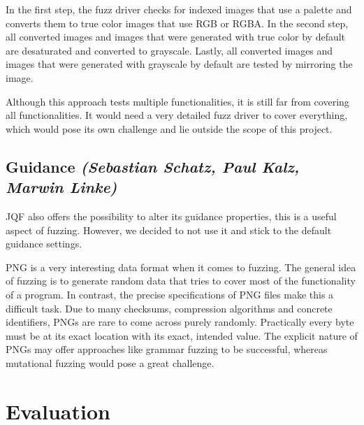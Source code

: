 \documentclass[runningheads]{llncs}
\begin{document}
In the first step, the fuzz driver checks for indexed images that use a palette and converts them to true color images that use RGB or RGBA. 
In the second step, all converted images and images that were generated with true color by default are desaturated and converted to grayscale.
Lastly, all converted images and images that were generated with grayscale by default are tested by mirroring the image.

Although this approach tests multiple functionalities, it is still far from covering all functionalities.
It would need a very detailed fuzz driver to cover everything, which would pose its own challenge and lie outside the scope of this project.

\subsection{Guidance \normalfont\textit{(Sebastian Schatz, Paul Kalz, Marwin Linke)}}
JQF also offers the possibility to alter its guidance properties, this is a useful aspect of fuzzing. However, we decided to not use it and stick to the default guidance settings.

PNG is a very interesting data format when it comes to fuzzing. The general idea of fuzzing is to generate random data that tries to cover most of the functionality of a program.
In contrast, the precise specifications of PNG files make this a difficult task. 
Due to many checksums, compression algorithms and concrete identifiers, PNGs are rare to come across purely randomly.
Practically every byte must be at its exact location with its exact, intended value.
The explicit nature of PNGs may offer approaches like grammar fuzzing to be successful, whereas mutational fuzzing would pose a great challenge.

\section{Evaluation}

\end{document}
